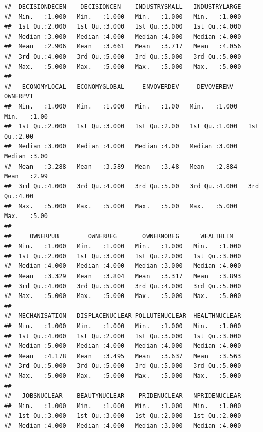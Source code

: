 \documentclass[
]{article}
\begin{document}
\begin{verbatim}
##  DECISIONDECEN    DECISIONCEN    INDUSTRYSMALL   INDUSTRYLARGE  
##  Min.   :1.000   Min.   :1.000   Min.   :1.000   Min.   :1.000  
##  1st Qu.:2.000   1st Qu.:3.000   1st Qu.:3.000   1st Qu.:4.000  
##  Median :3.000   Median :4.000   Median :4.000   Median :4.000  
##  Mean   :2.906   Mean   :3.661   Mean   :3.717   Mean   :4.056  
##  3rd Qu.:4.000   3rd Qu.:5.000   3rd Qu.:5.000   3rd Qu.:5.000  
##  Max.   :5.000   Max.   :5.000   Max.   :5.000   Max.   :5.000  
##                                                                 
##   ECONOMYLOCAL   ECONOMYGLOBAL     ENVOVERDEV     DEVOVERENV       OWNERPVT   
##  Min.   :1.000   Min.   :1.000   Min.   :1.00   Min.   :1.000   Min.   :1.00  
##  1st Qu.:2.000   1st Qu.:3.000   1st Qu.:2.00   1st Qu.:1.000   1st Qu.:2.00  
##  Median :3.000   Median :4.000   Median :4.00   Median :3.000   Median :3.00  
##  Mean   :3.288   Mean   :3.589   Mean   :3.48   Mean   :2.884   Mean   :2.99  
##  3rd Qu.:4.000   3rd Qu.:4.000   3rd Qu.:5.00   3rd Qu.:4.000   3rd Qu.:4.00  
##  Max.   :5.000   Max.   :5.000   Max.   :5.00   Max.   :5.000   Max.   :5.00  
##                                                                               
##     OWNERPUB        OWNERREG       OWNERNOREG      WEALTHLIM    
##  Min.   :1.000   Min.   :1.000   Min.   :1.000   Min.   :1.000  
##  1st Qu.:2.000   1st Qu.:3.000   1st Qu.:2.000   1st Qu.:3.000  
##  Median :4.000   Median :4.000   Median :3.000   Median :4.000  
##  Mean   :3.329   Mean   :3.804   Mean   :3.317   Mean   :3.893  
##  3rd Qu.:4.000   3rd Qu.:5.000   3rd Qu.:4.000   3rd Qu.:5.000  
##  Max.   :5.000   Max.   :5.000   Max.   :5.000   Max.   :5.000  
##                                                                 
##  MECHANISATION   DISPLACENUCLEAR POLLUTENUCLEAR  HEALTHNUCLEAR  
##  Min.   :1.000   Min.   :1.000   Min.   :1.000   Min.   :1.000  
##  1st Qu.:4.000   1st Qu.:2.000   1st Qu.:3.000   1st Qu.:3.000  
##  Median :5.000   Median :4.000   Median :4.000   Median :4.000  
##  Mean   :4.178   Mean   :3.495   Mean   :3.637   Mean   :3.563  
##  3rd Qu.:5.000   3rd Qu.:5.000   3rd Qu.:5.000   3rd Qu.:5.000  
##  Max.   :5.000   Max.   :5.000   Max.   :5.000   Max.   :5.000  
##                                                                 
##   JOBSNUCLEAR    BEAUTYNUCLEAR    PRIDENUCLEAR   NPRIDENUCLEAR  
##  Min.   :1.000   Min.   :1.000   Min.   :1.000   Min.   :1.000  
##  1st Qu.:3.000   1st Qu.:3.000   1st Qu.:2.000   1st Qu.:2.000  
##  Median :4.000   Median :4.000   Median :3.000   Median :4.000  

\end{verbatim}
\end{document}
